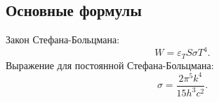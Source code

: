 \subsection*{Основные формулы}

Закон Стефана-Больцмана:
\begin{equation*}
    W = \varepsilon_T S \sigma T^4.
\end{equation*}
Выражение для постоянной Стефана-Больцмана:
\begin{equation*}
    \sigma = \frac{2 \pi^5 k^4}{15 h^3 c^2}.
\end{equation*}